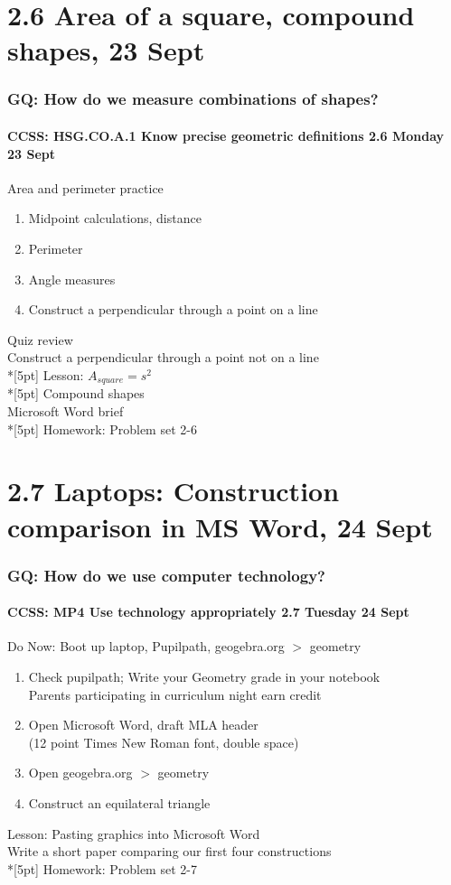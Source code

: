 \documentclass{beamer}
\begin{document}
  \section{2.6 Area of a square, compound shapes, 23 Sept}
  \frame
  {
    \frametitle{GQ: How do we measure combinations of shapes?}
    \framesubtitle{CCSS: HSG.CO.A.1 Know precise geometric definitions \hfill \alert{2.6 Monday 23 Sept}}

    \begin{block}{Area and perimeter practice}
    \begin{enumerate}
      \item Midpoint calculations, distance
      \item Perimeter
      \item Angle measures
      \item Construct a perpendicular through a point on a line
    \end{enumerate}
    \end{block}
    Quiz review \\
    Construct a perpendicular through a point not on a line \\*[5pt]
    Lesson: $\displaystyle A_{square}=s^2$ \\*[5pt]
    Compound shapes \\
    Microsoft Word brief \\*[5pt]
    Homework: Problem set 2-6
  }

  \section{2.7 Laptops: Construction comparison in MS Word, 24 Sept}
  \frame
  {
    \frametitle{GQ: How do we use computer technology?}
    \framesubtitle{CCSS: MP4 Use technology appropriately \hfill \alert{2.7 Tuesday 24 Sept}}
  
    \begin{block}{Do Now: Boot up laptop, Pupilpath, geogebra.org $>$ geometry}
    \begin{enumerate}
        \item Check pupilpath; Write your Geometry grade in your notebook \\
        \alert{Parents participating in curriculum night earn credit}
        \item Open Microsoft Word, draft MLA header \\
        (12 point Times New Roman font, double space)
        \item Open geogebra.org $>$ geometry
        \item Construct an equilateral triangle
    \end{enumerate}
    \end{block}
    Lesson: Pasting graphics into Microsoft Word \\
    Write a short paper comparing our first four constructions \\*[5pt]
    Homework: Problem set 2-7
  }
\end{document}
